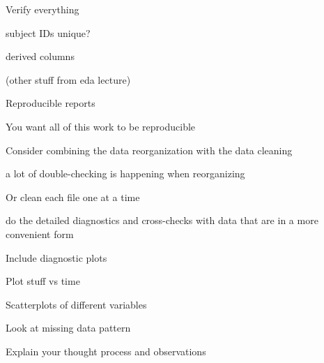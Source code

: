 \documentclass[aspectratio=169,12pt,t]{beamer}
\begin{document}
\begin{frame}{Verify everything}

\bbi
\item subject IDs unique?
\item derived columns
\item (other stuff from eda lecture)
\ei

  \note{
  }
\end{frame}




\begin{frame}{Reproducible reports}

\bbi
\item You want all of this work to be reproducible
\item Consider combining the data reorganization with the data
  cleaning
  \bi
    \item a lot of double-checking is happening when reorganizing
  \ei
\item Or clean each file one at a time
  \bi
    \item do the detailed diagnostics and cross-checks with data that are
      in a more convenient form
  \ei
\item Include diagnostic plots
  \bi
    \item Plot stuff vs time
    \item Scatterplots of different variables
    \item Look at missing data pattern
  \ei
\item Explain your thought process and observations
  \ei

  \note{
  }
\end{frame}
\end{document}
